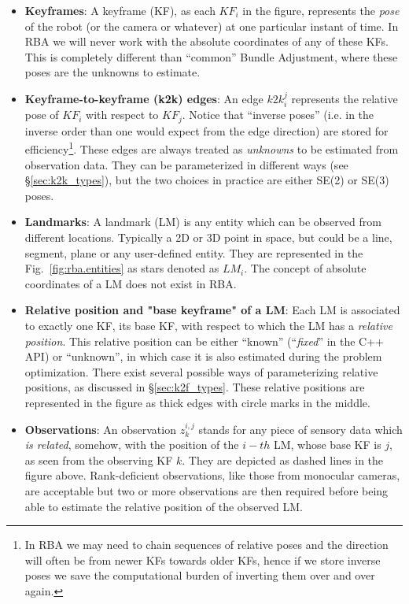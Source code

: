 \documentclass[a4paper,11pt]{article}
\begin{document}
\begin{itemize}
\item{\textbf{Keyframes}: A keyframe (KF), as each $KF_i$ in the figure, represents the \emph{pose} of the robot (or the 
camera or whatever) at one  particular instant of time. In RBA we will never work with the absolute coordinates of any of 
these KFs. This is completely different than ``common'' Bundle Adjustment, where these poses are the unknowns to 
estimate.
}
\item{\textbf{Keyframe-to-keyframe (k2k) edges}: An edge $k2k_i^j$ represents the relative pose of $KF_i$ with respect to 
$KF_j$. Notice that ``inverse poses'' (i.e. in the inverse order than one would expect from the edge direction) are 
stored for efficiency\footnote{In RBA we may need to chain sequences of relative poses and the direction will often 
be from newer KFs towards older KFs, hence if we store inverse poses we save the computational burden of inverting them 
over and over again.}. These edges are always treated as \emph{unknowns} to be estimated from observation data.
They can be parameterized in different ways (see \S\ref{sec:k2k_types}), but the two choices in practice are 
either SE(2) or SE(3) poses.
}
\item{\textbf{Landmarks}: A landmark (LM) is any entity which can be observed from different locations. Typically a 2D 
or 3D point in space, but could be a line, segment, plane or any user-defined entity. They are represented in 
the Fig.~\ref{fig:rba.entities} as stars denoted as $LM_i$. The concept of absolute coordinates of a LM 
does not exist in RBA.
}
\item{\textbf{Relative position and "base keyframe" of a LM}: Each LM is associated to exactly one KF, its {base KF}, with 
respect to which the LM has a \emph{relative position}. This relative position can be either ``known'' (``\emph{fixed}'' 
in the C++ API) or ``unknown'', in which case it is also estimated during the problem optimization. There exist several 
possible ways of parameterizing relative positions, as discussed in \S\ref{sec:k2f_types}. These relative positions are 
represented in the figure as thick edges with circle marks in the middle.
}
\item{\textbf{Observations}: An observation $z^{i,j}_k$ stands for any piece of sensory data which \emph{is related}, 
somehow, with the position of the $i-th$ LM, whose base KF is $j$, as seen from the observing KF $k$. They are 
depicted as dashed lines in the figure above. Rank-deficient observations, like those from monocular cameras, are 
acceptable but two or more observations are then required before being able to estimate the relative position of the 
observed LM.
}
\end{itemize}
\end{document}
